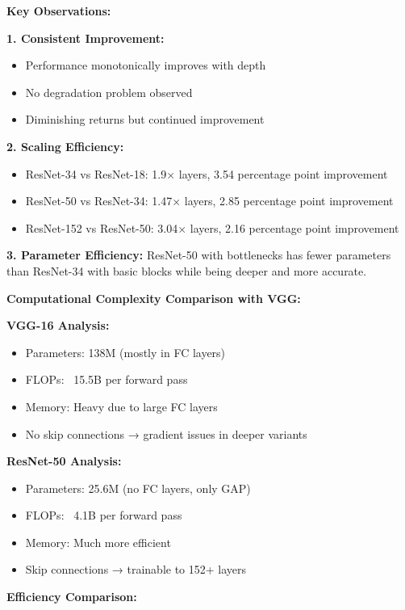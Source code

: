 \documentclass[12pt]{article}
\begin{document}
\begin{enumerate}[(a)]
{    \textbf{Key Observations:}
    
    \textbf{1. Consistent Improvement:}
    \begin{itemize}
        \item Performance monotonically improves with depth
        \item No degradation problem observed
        \item Diminishing returns but continued improvement
    \end{itemize}
    
    \textbf{2. Scaling Efficiency:}
    \begin{itemize}
        \item ResNet-34 vs ResNet-18: 1.9× layers, 3.54 percentage point improvement
        \item ResNet-50 vs ResNet-34: 1.47× layers, 2.85 percentage point improvement
        \item ResNet-152 vs ResNet-50: 3.04× layers, 2.16 percentage point improvement
    \end{itemize}
    
    \textbf{3. Parameter Efficiency:}
    ResNet-50 with bottlenecks has fewer parameters than ResNet-34 with basic blocks while being deeper and more accurate.
    
    \textbf{Computational Complexity Comparison with VGG:}
    
    \textbf{VGG-16 Analysis:}
    \begin{itemize}
        \item Parameters: 138M (mostly in FC layers)
        \item FLOPs: ~15.5B per forward pass
        \item Memory: Heavy due to large FC layers
        \item No skip connections → gradient issues in deeper variants
    \end{itemize}
    
    \textbf{ResNet-50 Analysis:}
    \begin{itemize}
        \item Parameters: 25.6M (no FC layers, only GAP)
        \item FLOPs: ~4.1B per forward pass  
        \item Memory: Much more efficient
        \item Skip connections → trainable to 152+ layers
    \end{itemize}
    
    \textbf{Efficiency Comparison:}
    
}
\end{enumerate}
\end{document}
